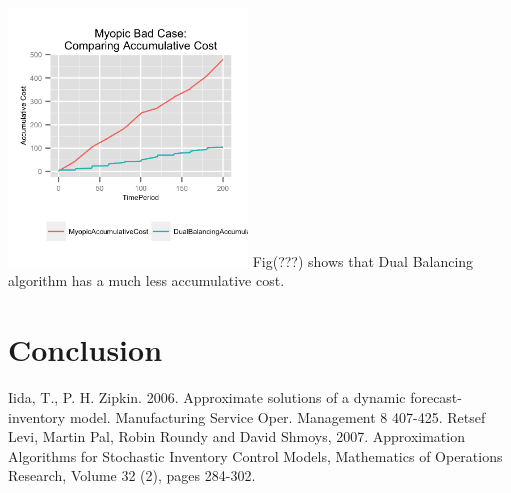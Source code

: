 \documentclass[twoside]{article}
\begin{document}
\begin{multicols}{2}
  \includegraphics[width=2.5in]{figures/MyopicBadAccumulativeCost.png}
  Fig(???) shows that Dual Balancing algorithm has a much less accumulative cost.

\section{Conclusion}

\lipsum[7] %


\begin{thebibliography}{99} %

Iida, T., P. H. Zipkin. 2006. Approximate solutions of a dynamic forecast-inventory model. Manufacturing Service Oper. Management
8 407-425.
Retsef Levi, Martin Pal, Robin Roundy and David Shmoys, 2007. Approximation Algorithms for Stochastic Inventory Control Models, Mathematics of Operations Research, Volume 32 (2), pages 284-302.

\end{thebibliography}


\end{multicols}
\end{document}
